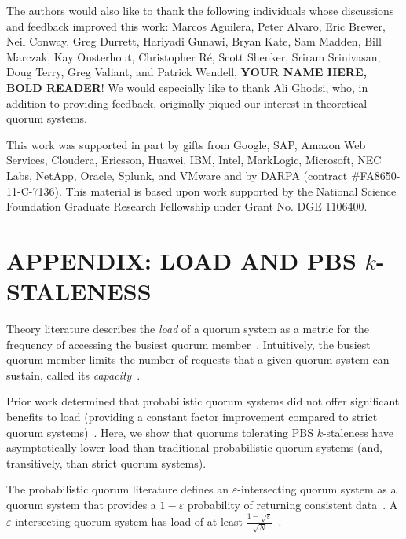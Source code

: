 \documentclass{vldb}
\newcommand{\sectionskip}{-0em}
\begin{document}
The authors would also like to thank the following individuals whose
discussions and feedback improved this work: Marcos Aguilera, Peter
Alvaro, Eric Brewer, Neil Conway, Greg Durrett, Hariyadi Gunawi, Bryan
Kate, Sam Madden, Bill Marczak, Kay Ousterhout, Christopher R\'e,
Scott Shenker, Sriram Srinivasan, Doug Terry, Greg Valiant, and
Patrick Wendell, \textbf{YOUR NAME HERE, BOLD READER}!  We would
especially like to thank Ali Ghodsi, who, in addition to providing
feedback, originally piqued our interest in theoretical quorum
systems.

This work was supported in part by gifts from Google, SAP,
Amazon Web Services, Cloudera, Ericsson, Huawei, IBM, Intel,
MarkLogic, Microsoft, NEC Labs, NetApp, Oracle, Splunk, and VMware and
by DARPA (contract \#FA8650-11-C-7136).  This material is based upon
work supported by the National Science Foundation Graduate Research
Fellowship under Grant No. DGE 1106400.

\balance

{\small


}

\vspace{\sectionskip}
\section*{APPENDIX: LOAD AND PBS {\large$k$}-STALENESS}
Theory literature describes the \textit{load} of a quorum system as a
metric for the frequency of accessing the busiest quorum
member~\cite[Definition 3.2]{quorumsystems}.  Intuitively, the busiest
quorum member limits the number of requests that a given quorum system
can sustain, called its \textit{capacity}~\cite[Corollary
  3.9]{quorumsystems}.

Prior work determined that probabilistic quorum systems did not offer
significant benefits to load (providing a constant factor improvement
compared to strict quorum systems)~\cite{prob-quorum}.  Here, we show
that quorums tolerating PBS $k$-staleness have asymptotically lower
load than traditional probabilistic quorum systems (and, transitively,
than strict quorum systems).

The probabilistic quorum literature defines an
$\varepsilon$-intersecting quorum system as a quorum system that
provides a $1-\varepsilon$ probability of returning consistent
data~\cite[Definition 3.1]{prob-quorum}.  A $\varepsilon$-intersecting
quorum system has load of at least 
$\frac{1-\sqrt{\varepsilon}}{\sqrt{N}}$~\cite[Corollary
  3.12]{prob-quorum}.
\end{document}
